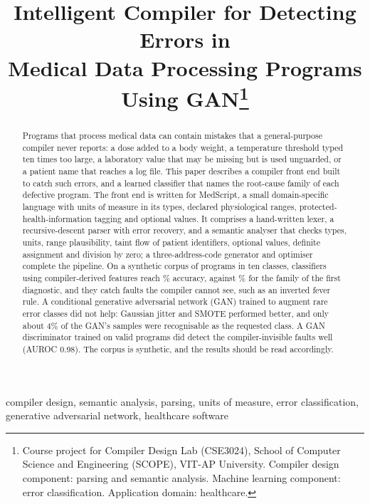 \documentclass[conference]{IEEEtran}
\begin{document}
\title{Intelligent Compiler for Detecting Errors in\\
Medical Data Processing Programs Using GAN\thanks{Course project for Compiler Design Lab (CSE3024), School of Computer
Science and Engineering (SCOPE), VIT-AP University. Compiler design component: parsing and semantic analysis.
Machine learning component: error classification. Application domain: healthcare.}}

\author{
\and
{}
}

\maketitle

\begin{abstract}
Programs that process medical data can contain mistakes that a general-purpose compiler never reports: a dose added to a
body weight, a temperature threshold typed ten times too large, a laboratory value that may be missing but is used
unguarded, or a patient name that reaches a log file. This paper describes a compiler front end built to catch such
errors, and a learned classifier that names the root-cause family of each defective program. The front end is written for
MedScript, a small domain-specific language with units of measure in its types, declared physiological ranges,
protected-health-information tagging and optional values. It comprises a hand-written lexer, a recursive-descent parser with
error recovery, and a semantic analyser that checks types, units, range plausibility, taint flow of patient identifiers,
optional values, definite assignment and division by zero; a three-address-code generator and optimiser complete the
pipeline. On a synthetic corpus of \NProg{} programs in ten classes, classifiers using compiler-derived features reach
\RFAcc\% accuracy, against \RuleFirstAcc\% for the family of the first diagnostic, and they catch faults the compiler cannot see,
such as an inverted fever rule. A conditional generative adversarial network (GAN) trained to augment rare error classes did not
help: Gaussian jitter and SMOTE performed better, and only about 4\% of the GAN's samples were recognisable as the requested class.
A GAN discriminator trained on valid programs did detect the compiler-invisible faults well (AUROC 0.98). The corpus is synthetic,
and the results should be read accordingly.
\end{abstract}

\begin{IEEEkeywords}
compiler design, semantic analysis, parsing, units of measure, error classification, generative adversarial network,
healthcare software
\end{IEEEkeywords}
\end{document}

